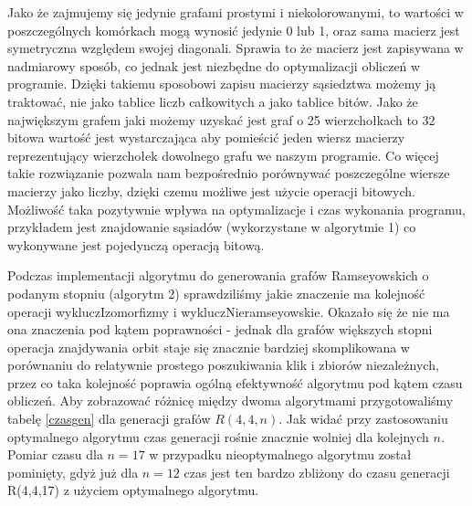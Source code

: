Jako że zajmujemy się jedynie grafami prostymi i niekolorowanymi, to wartości w poszczególnych komórkach mogą wynosić jedynie 0 lub 1, oraz sama macierz jest symetryczna względem swojej diagonali. Sprawia to że macierz jest zapisywana w nadmiarowy sposób, co jednak jest niezbędne do optymalizacji obliczeń w programie. Dzięki takiemu sposobowi zapisu macierzy sąsiedztwa możemy ją traktować, nie jako tablice liczb całkowitych a jako tablice bitów. Jako że największym grafem jaki możemy uzyskać jest graf o 25 wierzchołkach to 32 bitowa wartość jest wystarczająca aby pomieścić jeden wiersz macierzy reprezentujący wierzchołek dowolnego grafu we naszym programie. Co więcej takie rozwiązanie pozwala nam bezpośrednio porównywać poszczególne wiersze macierzy jako liczby, dzięki czemu możliwe jest użycie operacji bitowych. Możliwość taka pozytywnie wpływa na optymalizacje i czas wykonania programu, przykładem jest znajdowanie sąsiadów (wykorzystane w algorytmie 1) co wykonywane jest pojedynczą operacją bitową.

Podczas implementacji algorytmu do generowania grafów Ramseyowskich o podanym stopniu (algorytm 2) sprawdziliśmy jakie znaczenie ma kolejność operacji wykluczIzomorfizmy i wykluczNieramseyowskie. Okazało się że nie ma ona znaczenia pod kątem poprawności - jednak dla grafów większych stopni operacja znajdywania orbit staje się znacznie bardziej skomplikowana w porównaniu do relatywnie prostego poszukiwania klik i zbiorów niezależnych, przez co taka kolejność poprawia ogólną efektywność algorytmu pod kątem czasu obliczeń. Aby zobrazować różnicę między dwoma algorytmami przygotowaliśmy tabelę \ref{czasgen} dla generacji grafów $R(4,4,n)$. Jak widać przy zastosowaniu optymalnego algorytmu czas generacji rośnie znacznie wolniej dla kolejnych $n$. Pomiar czasu dla $n=17$ w przypadku nieoptymalnego algorytmu został pominięty, gdyż już dla $n=12$ czas jest ten bardzo zbliżony do czasu generacji R(4,4,17) z użyciem optymalnego algorytmu.

